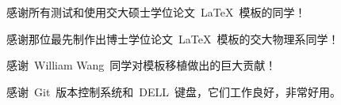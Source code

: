 
\begin{thanks}

  感谢所有测试和使用交大硕士学位论文~\LaTeX~模板的同学！

  感谢那位最先制作出博士学位论文~\LaTeX~模板的交大物理系同学！

  感谢~William Wang~同学对模板移植做出的巨大贡献！

  感谢~Git~版本控制系统和~DELL~键盘，它们工作良好，非常好用。
  
\end{thanks}
